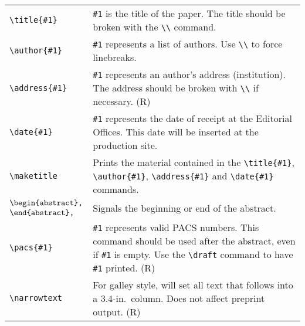 \begin{quasitable}
\begin{tabular}{lp{4.5in}}
\verb+\title{#1}+  &
              \verb+#1+ is the title of the paper. The title should be
                        broken with the \verb+\\+ command.
                          \\[4pt]

\verb+\author{#1}+  &
             \verb+#1+ represents a list of authors. Use \verb+\\+ to force
                        linebreaks.
                          \\[4pt]

\verb+\address{#1}+  &
            \verb+#1+ represents an author's address (institution).  The
            address should be broken with \verb+\\+ if necessary. (R)
                          \\[4pt]

\verb+\date{#1}+  &
               \verb+#1+ represents the date of receipt at the Editorial
                        Offices. This date will be inserted at the production
                        site.
                          \\[4pt]

\verb+\maketitle+  &
              Prints the material contained in the \verb+\title{#1}+,
              \verb+\author{#1}+, \verb+\address{#1}+ and
              \verb+\date{#1}+ commands.
                \\[4pt]

$\vcenter{\hbox{\verb+\begin{abstract},+}
          \hbox{\verb+\end{abstract},+}}$
&
       Signals the beginning or end of the abstract.
                          \\[4pt]

\verb+\pacs{#1}+  &
   \verb+#1+ represents valid PACS numbers. This command should be
    used after the abstract, even if \verb+#1+ is empty.  Use the
            \verb+\draft+ command to have \verb+#1+ printed. (R)
              \\[4pt]

\verb+\narrowtext+  &
             For galley style, will set all text that follows into
            a 3.4-in.\ column. Does not affect preprint output. (R)
                          \\[4pt]


\end{tabular}
\end{quasitable}
